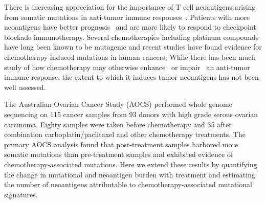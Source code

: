 There is increasing appreciation for the importance of T cell neoantigens arising from somatic mutations in anti-tumor immune responses~\cite{Schumacher_2015}. Patients with more neoantigens have better prognosis~\cite{Brown_2014} and are more likely to respond to checkpoint blockade immunotherapy\cite{Van_Allen_2015,Rizvi_2015}. Several chemotherapies including platinum compounds have long been known to be mutagenic\cite{Hannan_1989} and recent studies have found evidence for chemotherapy-induced mutations in human cancers\cite{Murugaesu_2015,Johnson_2013}. While there has been much study of how chemotherapy may otherwise enhance~\cite{Hato_2012,Machiels2001,Hodge2013} or impair~\cite{Litterman_2013} an anti-tumor immune response, the extent to which it induces tumor neoantigens has not been well assessed.

The Australian Ovarian Cancer Study (AOCS) performed whole genome sequencing on 115 cancer samples from 93 donors with high grade serous ovarian carcinoma\cite{Patch_2015}. Eighty samples were taken before chemotherapy and 35 after combination carboplatin/paclitaxel and other chemotherapy treatments. The primary AOCS analysis found that post-treatment samples harbored more somatic mutations than pre-treatment samples and exhibited evidence of chemotherapy-associated mutations. Here we extend these results by quantifying the change in mutational and neoantigen burden with treatment and estimating the number of neoantigens attributable to chemotherapy-associated mutational signatures.


